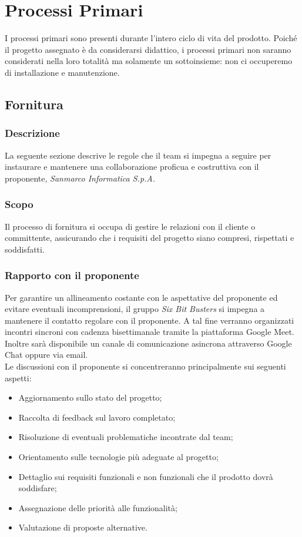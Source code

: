 \section{Processi Primari}
I processi primari sono presenti durante l'intero ciclo di vita del
prodotto. Poiché il progetto assegnato è da considerarsi didattico, i processi
primari non saranno considerati nella loro totalità ma solamente un
sottoinsieme: non ci occuperemo di installazione e manutenzione.

\subsection{Fornitura}
\subsubsection{Descrizione}
La seguente sezione descrive le regole che il team si impegna a seguire per
instaurare e mantenere una collaborazione proficua e costruttiva con il
proponente, \textit{Sanmarco Informatica S.p.A.}

\subsubsection{Scopo}
Il processo di fornitura si occupa di gestire le
relazioni con il cliente o committente, assicurando che i requisiti del
progetto siano compresi, rispettati e soddisfatti.

\subsubsection{Rapporto con il proponente}
Per garantire un allineamento costante con le aspettative del proponente ed
evitare eventuali incomprensioni, il gruppo \textit{Six Bit Busters} si impegna
a mantenere il contatto regolare con il proponente. A tal fine verranno
organizzati incontri sincroni con cadenza bisettimanale tramite la piattaforma
Google Meet. Inoltre sarà disponibile un canale di comunicazione asincrona
attraverso Google Chat oppure via email.\\

Le discussioni con il proponente si concentreranno principalmente sui seguenti
aspetti:

\begin{itemize}
    \item Aggiornamento sullo stato del progetto;
    \item Raccolta di feedback sul lavoro completato;
    \item Risoluzione di eventuali problematiche incontrate dal team;
    \item Orientamento sulle tecnologie più adeguate al progetto;
    \item Dettaglio sui requisiti funzionali e non funzionali che il prodotto dovrà
          soddisfare;
    \item Assegnazione delle priorità alle funzionalità;
    \item Valutazione di proposte alternative.
\end{itemize}

